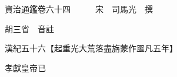 










 


 
 


 

  
  
  
  
  





  
  
  
  
  
 
  

  

  
  
  



  

 
 

  
   




  

  
  


  　　資治通鑑卷六十四　　　宋　司馬光　撰

　　胡三省　音註

　　漢紀五十六【起重光大荒落盡旃蒙作噩凡五年】

　　孝獻皇帝已

